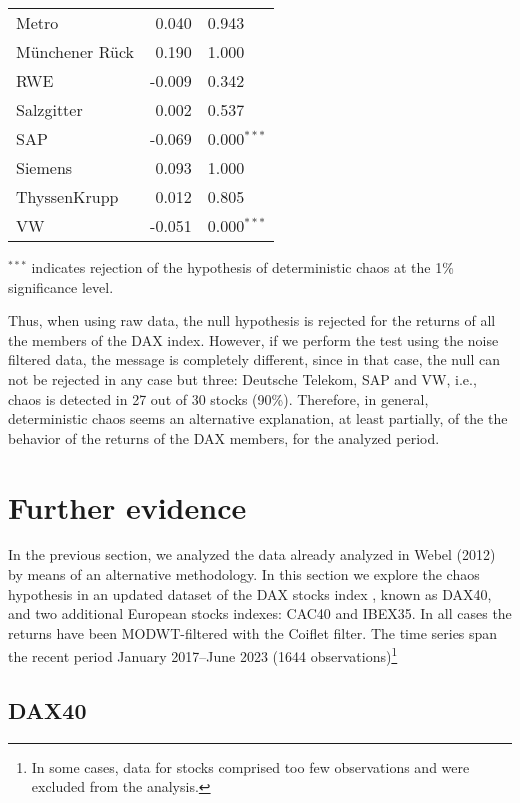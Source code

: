 \documentclass[12pt]{article}
\begin{document}
\begin{table} [H]
\begin{tabular*}{\textwidth}{@{\extracolsep{\fill}}lrl}
        Metro                     & 0.040 & 0.943  \\ 
        M\"unchener R\"uck        & 0.190 &  1.000 \\ 
        RWE                       & -0.009 &  0.342 \\ 
        Salzgitter                & 0.002 &  0.537 \\ 
        SAP                       & -0.069 &  0.000$^{***}$ \\ 
        Siemens                   & 0.093 & 1.000  \\ 
        ThyssenKrupp              & 0.012 &  0.805 \\ 
        VW                        & -0.051 &  0.000$^{***}$ \\ 
        \hline      
    \end{tabular*}
        {$^{***}$ indicates rejection of the hypothesis of  deterministic chaos at the 1\% significance level.}
\end{table}

Thus, when using raw data, the null hypothesis is rejected for the returns of all the members of the
DAX index. However, if we perform the test using the noise filtered data, the message is completely different,
since in that case, the null can not be rejected in any case but three: Deutsche Telekom, SAP and VW, i.e., chaos is detected in 27 out of 30 stocks (90\%).
Therefore, in general, deterministic chaos seems an alternative explanation, at least partially, of the 
the behavior of the returns of the DAX members, for the analyzed period.





\section{Further evidence}

In the previous section, we analyzed the data already analyzed in Webel (2012) by means of an alternative methodology. In this section
we explore the chaos hypothesis in an updated dataset of the DAX stocks index , known as DAX40, and two additional European  stocks indexes: CAC40 and IBEX35. In all cases the returns have been MODWT-filtered with the Coiflet filter. The time series span the recent period January 2017--June 2023 (1644 observations)\footnote{In some cases, data for stocks comprised too few observations and were excluded from the analysis.}

\subsection{DAX40}
\end{document}
